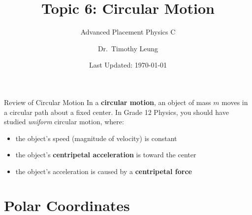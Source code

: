 \documentclass[12pt,compress,aspectratio=169]{beamer}
\title{Topic 6: Circular Motion}
\subtitle{Advanced Placement Physics C}
\author[TML]{Dr.\ Timothy Leung}
\institute{Olympiads School}
\date{Last Updated: \today}
\begin{document}
\begin{frame}
  \maketitle
\end{frame}





\begin{frame}{Review of Circular Motion}
  In a \textbf{circular motion}, an object of mass $m$ moves in a circular path
  about a fixed center. In Grade 12 Physics, you should have studied
  \emph{uniform} circular motion, where:
  \begin{itemize}
  \item the object's speed (magnitude of velocity) is constant
  \item the object's \textbf{centripetal acceleration} is toward the center
  \item the object's acceleration is caused by a \textbf{centripetal force}
  \end{itemize}
\end{frame}



\section{Polar Coordinates}
\end{document}
